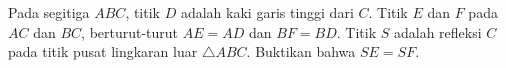 Pada segitiga $ABC$, titik $D$ adalah kaki garis tinggi dari $C$. Titik $E$ dan $F$ pada $AC$ dan $BC$, berturut-turut $AE = AD$ dan $BF = BD$. Titik $S$ adalah refleksi $C$ pada titik pusat lingkaran luar $\triangle ABC$. Buktikan bahwa $SE=SF$.